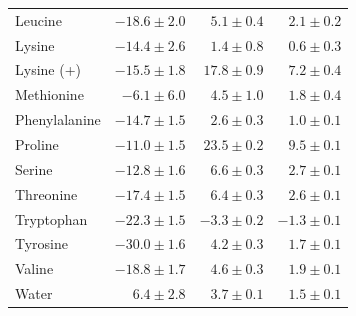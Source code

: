 \documentclass[9pt]{article}
\begin{document}
\begin{table}
{\begin{tabular}{lrrr}
Leucine           & $-18.6 \pm 2.0$  & $5.1   \pm 0.4$ & $2.1   \pm 0.2$ \\
Lysine            & $-14.4 \pm 2.6$  & $1.4   \pm 0.8$ & $0.6   \pm 0.3$ \\
Lysine (+)        & $-15.5 \pm 1.8$  & $17.8  \pm 0.9$ & $7.2   \pm 0.4$ \\
Methionine        & $-6.1  \pm 6.0$  & $4.5   \pm 1.0$ & $1.8   \pm 0.4$ \\
Phenylalanine     & $-14.7 \pm 1.5$  & $2.6   \pm 0.3$ & $1.0   \pm 0.1$ \\
Proline           & $-11.0 \pm 1.5$  & $23.5  \pm 0.2$ & $9.5   \pm 0.1$ \\
Serine            & $-12.8 \pm 1.6$  & $6.6   \pm 0.3$ & $2.7   \pm 0.1$ \\
Threonine         & $-17.4 \pm 1.5$  & $6.4   \pm 0.3$ & $2.6   \pm 0.1$ \\
Tryptophan        & $-22.3 \pm 1.5$  & $-3.3  \pm 0.2$ & $-1.3  \pm 0.1$ \\
Tyrosine          & $-30.0 \pm 1.6$  & $4.2   \pm 0.3$ & $1.7   \pm 0.1$ \\
Valine            & $-18.8 \pm 1.7$  & $4.6   \pm 0.3$ & $1.9   \pm 0.1$ \\
Water             & $6.4   \pm 2.8$  & $3.7   \pm 0.1$ & $1.5   \pm 0.1$ \\
\bottomrule
\end{tabular}
}
\end{table}
\end{document}

